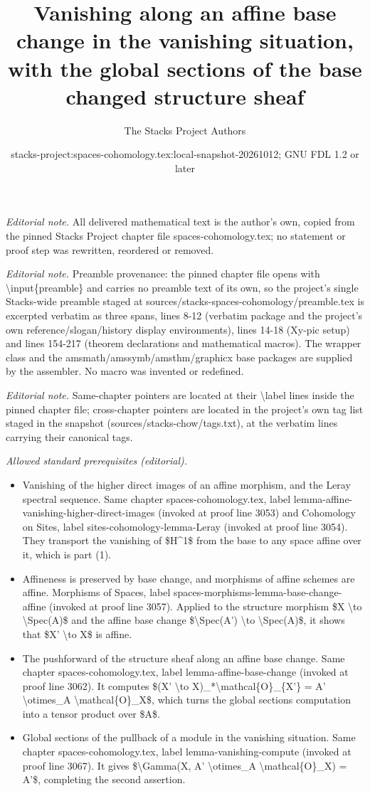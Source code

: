 \documentclass[10pt,a4paper]{amsart}
\title{Vanishing along an affine base change in the vanishing situation, with the global sections of the base changed structure sheaf}
\author{The Stacks Project Authors}
\date{stacks-project:spaces-cohomology.tex:local-snapshot-20261012; GNU FDL 1.2 or later}
\theoremstyle{plain}
\theoremstyle{definition}
\theoremstyle{remark}
\numberwithin{equation}{subsection}
\begin{document}
\maketitle
\noindent\textit{Editorial note.} All delivered mathematical text is the author's own, copied from the pinned Stacks Project chapter file spaces-cohomology.tex; no statement or proof step was rewritten, reordered or removed.\par\medskip
\noindent\textit{Editorial note.} Preamble provenance: the pinned chapter file opens with \textbackslash{}input\{preamble\} and carries no preamble text of its own, so the project's single Stacks-wide preamble staged at sources/stacks-spaces-cohomology/preamble.tex is excerpted verbatim as three spans, lines 8-12 (verbatim package and the project's own reference/slogan/history display environments), lines 14-18 (Xy-pic setup) and lines 154-217 (theorem declarations and mathematical macros). The wrapper class and the amsmath/amssymb/amsthm/graphicx base packages are supplied by the assembler. No macro was invented or redefined.\par\medskip
\noindent\textit{Editorial note.} Same-chapter pointers are located at their \textbackslash{}label lines inside the pinned chapter file; cross-chapter pointers are located in the project's own tag list staged in the snapshot (sources/stacks-chow/tags.txt), at the verbatim lines carrying their canonical tags.\par\medskip
\noindent\textit{Allowed standard prerequisites (editorial).}\begin{itemize}
\item Vanishing of the higher direct images of an affine morphism, and the Leray spectral sequence. Same chapter spaces-cohomology.tex, label lemma-affine-vanishing-higher-direct-images (invoked at proof line 3053) and Cohomology on Sites, label sites-cohomology-lemma-Leray (invoked at proof line 3054). They transport the vanishing of \$H\textasciicircum{}1\$ from the base to any space affine over it, which is part (1).
\item Affineness is preserved by base change, and morphisms of affine schemes are affine. Morphisms of Spaces, label spaces-morphisms-lemma-base-change-affine (invoked at proof line 3057). Applied to the structure morphism \$X \textbackslash{}to \textbackslash{}Spec(A)\$ and the affine base change \$\textbackslash{}Spec(A') \textbackslash{}to \textbackslash{}Spec(A)\$, it shows that \$X' \textbackslash{}to X\$ is affine.
\item The pushforward of the structure sheaf along an affine base change. Same chapter spaces-cohomology.tex, label lemma-affine-base-change (invoked at proof line 3062). It computes \$(X' \textbackslash{}to X)\_*\textbackslash{}mathcal\{O\}\_\{X'\} = A' \textbackslash{}otimes\_A \textbackslash{}mathcal\{O\}\_X\$, which turns the global sections computation into a tensor product over \$A\$.
\item Global sections of the pullback of a module in the vanishing situation. Same chapter spaces-cohomology.tex, label lemma-vanishing-compute (invoked at proof line 3067). It gives \$\textbackslash{}Gamma(X, A' \textbackslash{}otimes\_A \textbackslash{}mathcal\{O\}\_X) = A'\$, completing the second assertion.
\end{itemize}\medskip
\end{document}
